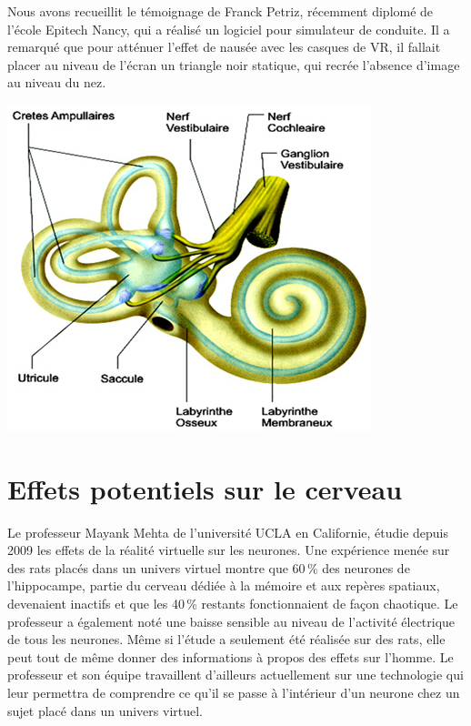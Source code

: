 \documentclass[12pt, a4paper]{report}
\begin{document}
Nous avons recueillit le témoignage de Franck Petriz, récemment diplomé de l'école Epitech Nancy, qui a réalisé un logiciel pour simulateur de conduite. Il a remarqué que pour atténuer l'effet de nausée avec les casques de VR, il fallait placer au niveau de l'écran un triangle noir statique, qui recrée l'absence d'image au niveau du nez.

\newpage{}

\begin{center}
\includegraphics[scale=0.5]{oreille.jpg}
\end{center}

\section[Effets sur le cerveau]{Effets potentiels sur le cerveau}

Le professeur Mayank Mehta de l'université UCLA en Californie, étudie depuis 2009 les effets de la réalité virtuelle sur les neurones. Une expérience menée sur des rats placés dans un univers virtuel montre que 60\,\% des neurones de l'hippocampe, partie du cerveau dédiée à la mémoire et aux repères spatiaux, devenaient inactifs et que les 40\,\% restants fonctionnaient de façon chaotique. Le professeur a également noté une baisse sensible au niveau de l'activité électrique de tous les neurones. Même si l'étude a seulement été réalisée sur des rats, elle peut tout de même donner des informations à propos des effets sur l'homme. Le professeur et son équipe travaillent d'ailleurs actuellement sur une technologie qui leur permettra de comprendre ce qu'il se passe à l'intérieur d'un neurone chez un sujet placé dans un univers virtuel.
\end{document}
